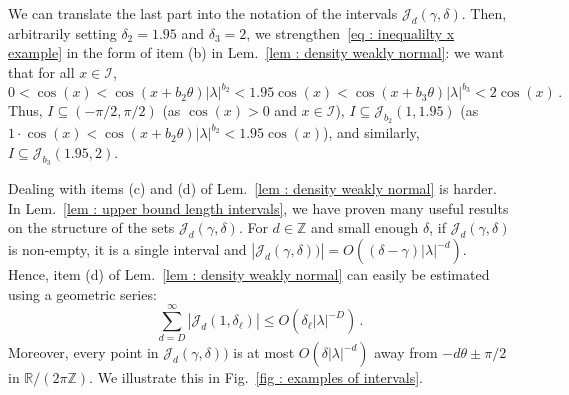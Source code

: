 \documentclass[a4paper,UKenglish,cleveref, autoref, thm-restate]{lipics-v2021}
\begin{document}
We can translate the last part into the notation of the intervals  $\mathcal{J}_d(\gamma, \delta)$.
Then, arbitrarily setting $\delta_2 = 1.95$ and $\delta_3 = 2$, we strengthen~\eqref{eq : inequalilty x example} in the form of item (b) in Lem.~\ref{lem : density weakly normal}: we want that for all $x \in \mathcal{I}$,
\begin{equation*}
    0 < \cos(x) < \cos(x + b_2\theta)|\lambda|^{b_2} <1.95 \cos(x) < \cos(x + b_3\theta)|\lambda|^{b_3} < 2 \cos(x)\,.
\end{equation*}
Thus, $I \subseteq (-\pi/2,\pi/2)$ (as $\cos(x) > 0$ and $x \in \mathcal{I}$), $I \subseteq \mathcal{J}_{b_2}(1, 1.95)$ (as $1\cdot \cos(x) < \cos(x + b_2\theta)|\lambda|^{b_2} <1.95 \cos(x)$), and similarly, $I \subseteq \mathcal{J}_{b_3}(1.95, 2)$.

Dealing with items (c) and (d) of Lem.~\ref{lem : density weakly normal} is harder. 
In Lem.~\ref{lem : upper bound length intervals}, we have proven many useful results on the structure of the sets $\mathcal{J}_d(\gamma, \delta)$.
For $d \in \mathbb{Z}$ and small enough $\delta$, if $\mathcal{J}_d(\gamma, \delta)$ is non-empty, it is a single interval and $|\mathcal{J}_d(\gamma, \delta))| = O((\delta-\gamma)|\lambda|^{-d})$.
Hence, item (d) of Lem.~\ref{lem : density weakly normal} can easily be estimated using a geometric series:
\begin{equation*}
    \sum_{d = D}^\infty |\mathcal{J}_d(1, \delta_\ell)| \le O(\delta_\ell|\lambda|^{-D})\,.
\end{equation*}
Moreover, every point in $\mathcal{J}_d(\gamma, \delta))$ is at most $O(\delta|\lambda|^{-d})$ away from $-d\theta \pm \pi/2$ in $\mathbb{R}/(2\pi\mathbb{Z})$.
We illustrate this in Fig.~\ref{fig : examples of intervals}.
\end{document}
